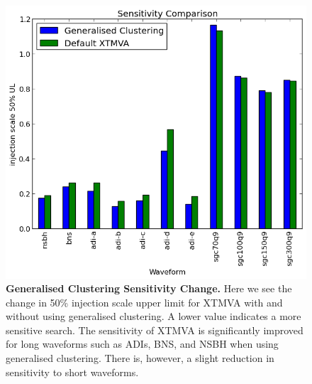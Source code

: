 \documentclass[11pt]{cuthesis}
\begin{document}
\begin{figure} %
\begin{center}
\includegraphics[width=0.8\linewidth]{gc_sensitivity_comparison.png}
\end{center}
\caption{\textbf{Generalised Clustering Sensitivity Change.} Here we see the change in 50\% injection scale upper limit for XTMVA with and without using generalised clustering. A lower value indicates a more sensitive search. The sensitivity of XTMVA is significantly improved for long waveforms such as ADIs, BNS, and NSBH when using generalised clustering. There is, however, a slight reduction in sensitivity to short waveforms. }
\label{fig:gc sensitivity}
\end{figure}
\end{document}
